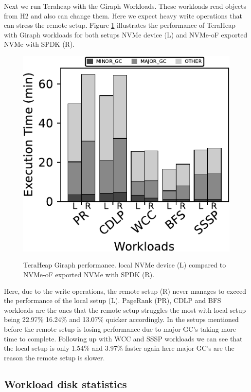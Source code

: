 \par Next we run Teraheap with the Giraph Workloads. These workloads read objects from H2 and also can change them. Here we expect heavy write operations that can stress the remote setup. Figure \ref{fig:bench_giraph} illustrates the performance of TeraHeap with Giraph workloads for both setups NVMe device (L) and NVMe-oF exported NVMe with SPDK (R).
\begin{figure}[H]
  \includegraphics[width=\linewidth]{figures/bench_giraph.pdf}\\
\caption{TeraHeap Giraph performance. local NVMe device (L) compared to NVMe-oF exported NVMe with SPDK (R).}
\label{fig:bench_giraph}
\end{figure}
Here, due to the write operations, the remote setup (R) never manages to exceed the performance of the local setup (L). PageRank (PR), CDLP and BFS workloads are the ones that the remote setup struggles the most with local setup being 22.97\% 16.24\% and 13.07\% quicker accordingly. In the setups mentioned before the remote setup is losing performance due to major GC's taking more time to complete. Following up with WCC and SSSP workloads we can see that the local setup is only 1.54\%	and 3.97\% faster again here major GC's are the reason the remote setup is slower.

\subsection{Workload disk statistics}

